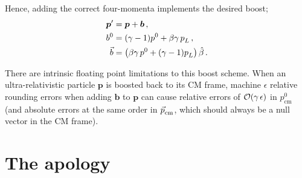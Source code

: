 \documentclass[12pt, nofootinbib, notitlepage]{revtex4}
\newcommand{\vecN}[1]{\hat{#1}}
\newcommand{\bs}[1]{\boldsymbol{#1}}
\newcommand{\Mu}[1]{\bs{#1}}
\newcommand{\CM}{\text{cm}}
\begin{document}
Hence, adding the correct four-momenta implements the desired boost;
\begin{align}
	\Mu{p}^\prime & = \Mu{p} + \Mu{b}
	\,,\\
	b^0 &= (\gamma - 1)p^0 + \beta\gamma \,p_L\ds
	\,,\\
	\vec{b} &= 	\left(\beta\gamma \,p^0 + (\gamma - 1)p_L\ds\right)\vecN{\beta}
	\,.
\end{align}

There are intrinsic floating point limitations to this boost scheme.
When an ultra-relativistic particle $\Mu{p}$ is boosted back to its CM frame,
machine $\epsilon$ relative rounding errors when adding $\Mu{b}$ to $\Mu{p}$
can cause relative errors of $\mathcal{O}(\gamma\,\epsilon)$ in $p^0_\CM$
(and absolute errors at the same order in $\vec{p}_\CM\ds$, 
which should always be a null vector in the CM frame).

\appendix*
\section{The apology}
\end{document}

